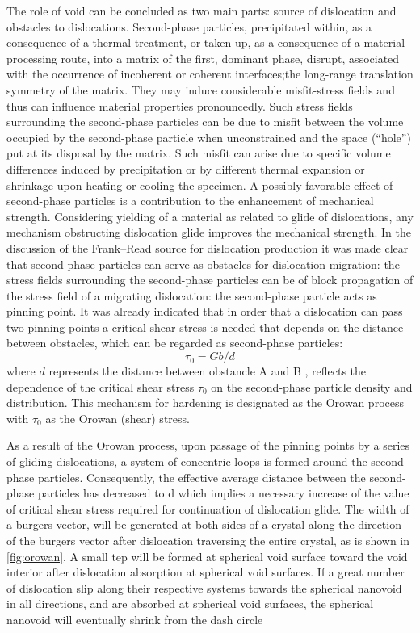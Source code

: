 \documentclass[metals,article,submit,moreauthors,pdftex,10pt,a4paper]{Definitions/mdpi}
\begin{document}
The role of void can be concluded as two main parts: source of dislocation and obstacles to dislocations.  Second-phase particles, precipitated within, as a consequence of a thermal treatment, or taken up, as a consequence of a material processing route, into a matrix of the first, dominant phase, disrupt, associated with the occurrence of incoherent or coherent interfaces;the long-range translation symmetry of the matrix. They may induce considerable misfit-stress fields and thus can influence material properties pronouncedly. Such stress fields surrounding the second-phase particles can be due to misfit between the volume occupied by the second-phase particle when unconstrained and the space (“hole”) put at its disposal by the matrix. Such misfit can arise due to specific volume differences induced by precipitation or by different thermal expansion or shrinkage upon heating or cooling the specimen. A possibly favorable effect of second-phase particles is a contribution to the enhancement of mechanical strength. Considering yielding of a material as related to glide of dislocations, any mechanism obstructing dislocation glide improves the mechanical strength. In the discussion of the Frank–Read source for dislocation production  it was made clear that second-phase particles can serve as obstacles for dislocation migration: the stress fields surrounding the second-phase particles can be of block propagation of the stress field of a migrating dislocation: the second-phase particle acts as pinning point. It was already indicated that in order that a dislocation can pass two pinning points a critical shear stress is needed that depends on the distance between  obstacles, which can be regarded as second-phase particles:
\begin{equation} \label{eq:orowan} 
\tau_0 = Gb/d
\end{equation}
where $d$ represents the distance between obstancle A and B , reflects the dependence of the critical shear stress $\tau_0$ on the second-phase particle density and distribution. This mechanism for hardening is designated as the Orowan process with $\tau_0$ as the Orowan (shear) stress.

As a result of the Orowan process, upon passage of the pinning points by a series of gliding dislocations, a system of concentric loops is formed around the second-phase particles. Consequently, the effective average distance between the second-phase particles has decreased to d which implies a necessary increase of the value of critical shear stress required for continuation of dislocation glide. The width of a burgers vector, will be generated at both sides of a crystal along the direction of the burgers vector after dislocation traversing the entire crystal, as is shown in \ref{fig:orowan}. A small tep will be formed at spherical void surface toward the void interior after dislocation absorption at spherical void surfaces. If a great number of dislocation slip along their respective systems towards the spherical nanovoid in all directions, and are absorbed at spherical void surfaces, the spherical nanovoid will eventually shrink from the dash circle 
\end{document}
